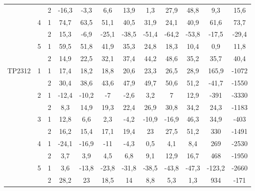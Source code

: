 \begin{table}[H]
\begin{adjustwidth}{-1em}{}
\begin{tabular}{|c|c|c|c|c|c|c|c|c|c|c|c|}
  \cline{3-12}          &       & 2     & -16,3 & -3,3  & 6,6   & 13,9  & 1,3   & 27,9  & 48,8  & 9,3   & 15,6 \bigstrut\\
  \cline{2-12}          & \multirow{2}[4]{*}{4} & 1     & 74,7  & 63,5  & 51,1  & 40,5  & 31,9  & 24,1  & 40,9  & 61,6  & 73,7 \bigstrut\\
  \cline{3-12}          &       & 2     & 15,3  & -6,9  & -25,1 & -38,5 & -51,4 & -64,2 & -53,8 & -17,5 & -29,4 \bigstrut\\
  \cline{2-12}          & \multirow{2}[4]{*}{5} & 1     & 59,5  & 51,8  & 41,9  & 35,3  & 24,8  & 18,3  & 10,4  & 0,9   & 11,8 \bigstrut\\
  \cline{3-12}          &       & 2     & 14,9  & 22,5  & 32,1  & 37,4  & 44,2  & 48,6  & 35,2  & 35,7  & 40,4 \bigstrut\\
      \hline
      \multicolumn{1}{|c|}{\multirow{10}[20]{*}{TP2312}} & \multirow{2}[4]{*}{1} & 1     & 17,4  & 18,2  & 18,8  & 20,6  & 23,3  & 26,5  & 28,9  & 165,9 & -1072 \bigstrut\\
  \cline{3-12}          &       & 2     & 30,4  & 38,6  & 43,6  & 47,9  & 49,7  & 50,6  & 51,2  & -41,7 & -1550 \bigstrut\\
  \cline{2-12}          & \multirow{2}[4]{*}{2} & 1     & -12,4 & -10,2 & -7    & -2,6  & 3,2   & 7     & 12,9  & -391  & -3330 \bigstrut\\
  \cline{3-12}          &       & 2     & 8,3   & 14,9  & 19,3  & 22,4  & 26,9  & 30,8  & 34,2  & 24,3  & -1183 \bigstrut\\
  \cline{2-12}          & \multirow{2}[4]{*}{3} & 1     & 12,8  & 6,6   & 2,3   & -4,2  & -10,9 & -16,9 & 46,3  & 34,9  & -403 \bigstrut\\
  \cline{3-12}          &       & 2     & 16,2  & 15,4  & 17,1  & 19,4  & 23    & 27,5  & 51,2  & 330   & -1491 \bigstrut\\
  \cline{2-12}          & \multirow{2}[4]{*}{4} & 1     & -24,1 & -16,9 & -11   & -4,3  & 0,5   & 4,1   & 8,4   & 269   & -2530 \bigstrut\\
  \cline{3-12}          &       & 2     & 3,7   & 3,9   & 4,5   & 6,8   & 9,1   & 12,9  & 16,7  & 468   & -1950 \bigstrut\\
  \cline{2-12}          & \multirow{2}[4]{*}{5} & 1     & 3,6   & -13,8 & -23,8 & -31,8 & -38,5 & -43,8 & -47,3 & -123,2 & -2660 \bigstrut\\
  \cline{3-12}          &       & 2     & 28,2  & 23    & 18,5  & 14    & 8,8   & 5,3   & 1,3   & 934   & -171 \bigstrut\\
      \hline
      \end{tabular}%
    \label{tab:Vcm1}%
    \end{adjustwidth}
  \end{table}



